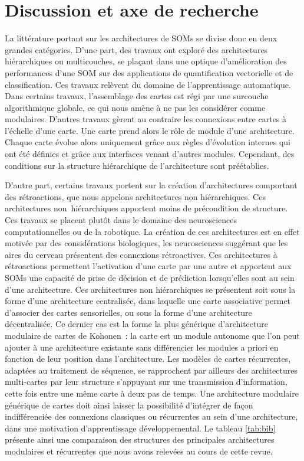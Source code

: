 \documentclass[../main]{subfiles}
\begin{document}
\section{Discussion et axe de recherche}

La littérature portant sur les architectures de SOMs se divise donc en deux grandes catégories. D'une part, des travaux ont exploré des architectures hiérarchiques ou multicouches, se plaçant dans une optique d'amélioration des performances d'une SOM sur des applications de quantification vectorielle et de classification. Ces travaux relèvent du domaine de l'apprentissage automatique. 
Dans certains travaux, l'assemblage des cartes est régi par une surcouche algorithmique globale, ce qui nous amène à ne pas les considérer comme modulaires. 
D'autres travaux gèrent au contraire les connexions entre cartes à l'échelle d'une carte. Une carte prend alors le rôle de module d'une architecture. Chaque carte évolue alors uniquement grâce aux règles d'évolution internes qui ont été définies et grâce aux interfaces venant d'autres modules. Cependant, des conditions sur la structure hiérarchique de l'architecture sont préétablies.

D'autre part, certains travaux portent sur la création d'architectures comportant des rétroactions, que nous appelons architectures non hiérarchiques. Ces architectures non~hiérarchiques apportent moins de précondition de structure.
Ces travaux se placent plutôt dans le domaine des neurosciences computationnelles ou de la robotique. La création de ces architectures est en effet motivée par des considérations biologiques, les neurosciences suggérant que les aires du cerveau présentent des connexions rétroactives. 
Ces architectures à rétroactions permettent l'activation d'une carte par une autre et apportent aux SOMs une capacité de prise de décision et de prédiction lorsqu'elles sont au sein d'une architecture. Ces architectures non hiérarchiques se présentent soit sous la forme d'une architecture centralisée, dans laquelle une carte associative permet d'associer des cartes sensorielles, ou sous la forme d'une architecture décentralisée. 
Ce dernier cas est la forme la plus générique d'architecture modulaire de cartes de Kohonen~: la carte est un module autonome que l'on peut ajouter à une architecture existante sans différencier les modules a priori en fonction de leur position dans l'architecture.
Les modèles de cartes récurrentes, adaptées au traitement de séquence, se rapprochent par ailleurs des architectures multi-cartes par leur structure s'appuyant sur une transmission d'information, cette fois entre une même carte à deux pas de temps. 
Une architecture modulaire générique de cartes doit ainsi laisser la possibilité d'intégrer de façon indifférenciée des connexions classiques ou récurrentes au sein d'une architecture, dans une motivation d'apprentissage développemental.
Le tableau \ref{tab:bib} présente ainsi une comparaison des structures des principales architectures modulaires et récurrentes que nous avons relevées au cours de cette revue. 
\end{document}

